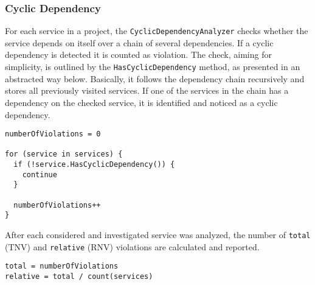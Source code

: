 \documentclass{article}
\begin{document}
\subsubsection{Cyclic Dependency}
For each service in a project, the \lstinline{CyclicDependencyAnalyzer} checks whether the service depends on itself over a chain of several dependencies. If a cyclic dependency is detected it is counted as violation. The check, aiming for simplicity, is outlined by the \lstinline{HasCyclicDependency} method, as presented in an abstracted way below. Basically, it follows the dependency chain recursively and stores all previously visited services. If one of the services in the chain has a dependency on the checked service, it is identified and noticed as a cyclic dependency.
\begin{lstlisting}
numberOfViolations = 0

for (service in services) {
  if (!service.HasCyclicDependency()) {
    continue
  }

  numberOfViolations++
}
\end{lstlisting}
After each considered and investigated service was analyzed, the number of \lstinline{total} (TNV) and \lstinline{relative} (RNV) violations are calculated and reported.
\begin{lstlisting}
total = numberOfViolations
relative = total / count(services)
\end{lstlisting}
\end{document}
